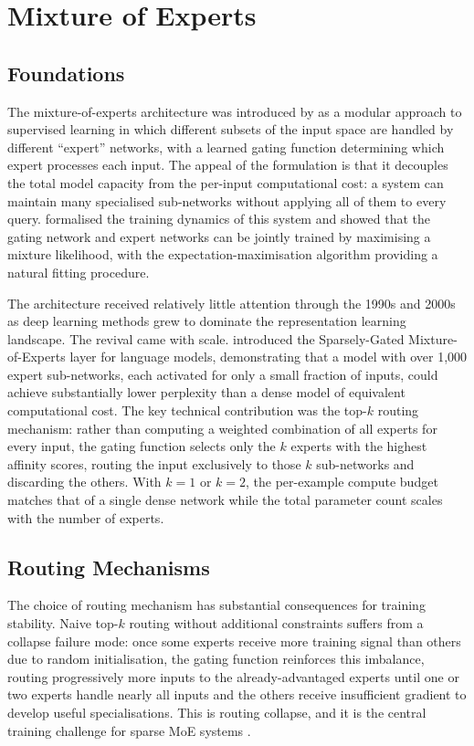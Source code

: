 ﻿\documentclass[12pt, a4paper, twoside]{report}
\numberwithin{equation}{chapter}
\begin{document}
\section{Mixture of Experts}

\subsection*{Foundations}

The mixture-of-experts architecture was introduced by \cite{jacobs1991} as a modular approach to supervised learning in which different subsets of the input space are handled by different ``expert'' networks, with a learned gating function determining which expert processes each input. The appeal of the formulation is that it decouples the total model capacity from the per-input computational cost: a system can maintain many specialised sub-networks without applying all of them to every query. \cite{jordan1994} formalised the training dynamics of this system and showed that the gating network and expert networks can be jointly trained by maximising a mixture likelihood, with the expectation-maximisation algorithm providing a natural fitting procedure.

The architecture received relatively little attention through the 1990s and 2000s as deep learning methods grew to dominate the representation learning landscape. The revival came with scale. \cite{shazeer2017} introduced the Sparsely-Gated Mixture-of-Experts layer for language models, demonstrating that a model with over 1,000 expert sub-networks, each activated for only a small fraction of inputs, could achieve substantially lower perplexity than a dense model of equivalent computational cost. The key technical contribution was the top-$k$ routing mechanism: rather than computing a weighted combination of all experts for every input, the gating function selects only the $k$ experts with the highest affinity scores, routing the input exclusively to those $k$ sub-networks and discarding the others. With $k=1$ or $k=2$, the per-example compute budget matches that of a single dense network while the total parameter count scales with the number of experts.

\subsection*{Routing Mechanisms}

The choice of routing mechanism has substantial consequences for training stability. Naive top-$k$ routing without additional constraints suffers from a collapse failure mode: once some experts receive more training signal than others due to random initialisation, the gating function reinforces this imbalance, routing progressively more inputs to the already-advantaged experts until one or two experts handle nearly all inputs and the others receive insufficient gradient to develop useful specialisations. This is routing collapse, and it is the central training challenge for sparse MoE systems \cite{shazeer2017}.
\end{document}
